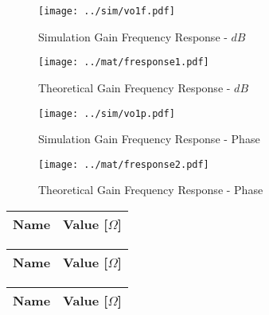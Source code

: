\begin{figure}[H]
      \texttt{[image: ../sim/vo1f.pdf]}
      \caption{Simulation Gain Frequency Response - $dB$}
    \endminipage\hfill
      \texttt{[image: ../mat/fresponse1.pdf]}
      \caption{Theoretical Gain Frequency Response - $dB$}
    \endminipage\hfill
\end{figure}

\begin{figure}[H]
      \texttt{[image: ../sim/vo1p.pdf]}
      \caption{Simulation Gain Frequency Response - Phase}
    \endminipage\hfill
      \texttt{[image: ../mat/fresponse2.pdf]}
      \caption{Theoretical Gain Frequency Response - Phase}
    \endminipage\hfill
\end{figure}

\begin{center}
  \begin{tabular}{ | c | c | }
    \hline    
    {\bf Name} & {\bf Value [$\Omega$]} \\ \hline
    
  \end{tabular}
\end{center}

\begin{center}
  \begin{tabular}{ | c | c | }
    \hline    
    {\bf Name} & {\bf Value [$\Omega$]} \\ \hline
    
  \end{tabular}
\end{center}

\begin{center}
  \begin{tabular}{ | c | c | }
    \hline    
    {\bf Name} & {\bf Value [$\Omega$]} \\ \hline
    
    \hline
  \end{tabular}
\end{center}



